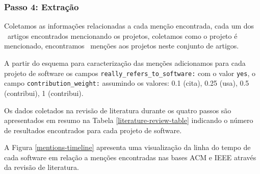 \subsubsection{Passo 4: Extração}

Coletamos as informações relacionadas a cada menção encontrada, cada um dos
\ScreeningUniqueCount \ artigos encontrados mencionando os projetos, coletamos
como o projeto é mencionado, encontramos \ScreeningCount \ menções aos
projetos neste conjunto de artigos.

A partir do esquema para caracterização das menções adicionamos para
cada projeto de software os campos \texttt{really\_refers\_to\_software:}
com o valor \texttt{yes}, o campo \texttt{contribution\_weight:} assumindo
os valores: 0.1 (cita), 0.25 (usa), 0.5 (contribui), 1 (contribui).

Os dados coletados na revisão de literatura durante os quatro passos são
apresentados em resumo na Tabela \ref{literature-review-table} indicando o
número de resultados encontrados para cada projeto de software.



A Figura \ref{mentions-timeline} apresenta uma visualização da linha do tempo
de cada software em relação a menções encontradas nas bases ACM e IEEE através
da revisão de literatura.

